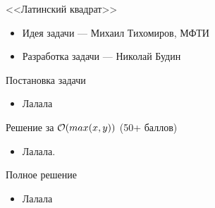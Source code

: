 \begin{frame}
  \begin{center}
    \LARGE <<Латинский квадрат>>
  \end{center}

  \begin{itemize}
  \item Идея задачи --- Михаил Тихомиров, МФТИ
  \item Разработка задачи --- Николай Будин
  \end{itemize}

\end{frame}

\begin{frame}{Постановка задачи}

  \begin{itemize}
  \item Лалала
  \end{itemize}
  
\end{frame}

\begin{frame}{Решение за $\mathcal{O}(max(x, y))$ (50+ баллов)}
  \begin{itemize}
  \item Лалала.
  \end{itemize}
\end{frame}

\begin{frame}{Полное решение}
  \begin{itemize}
  \item Лалала
  \end{itemize}
\end{frame}
